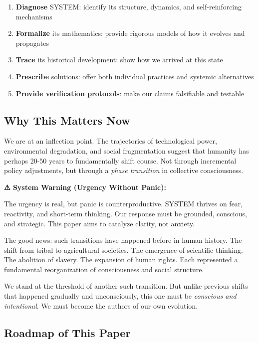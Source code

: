 \documentclass[11pt,a4paper]{article}
\theoremstyle{definition}
\theoremstyle{remark}
\newenvironment{systemwarning}[1]
{
    \begin{mdframed}[backgroundcolor=warningred!10,linecolor=warningred,linewidth=2pt]
    \textbf{⚠ System Warning (#1):}
}
{
    \end{mdframed}
}
\begin{document}
\begin{enumerate}
    \item \textbf{Diagnose} SYSTEM: identify its structure, dynamics, and self-reinforcing mechanisms
    \item \textbf{Formalize} its mathematics: provide rigorous models of how it evolves and propagates
    \item \textbf{Trace} its historical development: show how we arrived at this state
    \item \textbf{Prescribe} solutions: offer both individual practices and systemic alternatives
    \item \textbf{Provide verification protocols}: make our claims falsifiable and testable
\end{enumerate}

\subsection{Why This Matters Now}

We are at an inflection point. The trajectories of technological power, environmental degradation, and social fragmentation suggest that humanity has perhaps 20-50 years to fundamentally shift course. Not through incremental policy adjustments, but through a \textit{phase transition} in collective consciousness.

\begin{systemwarning}{Urgency Without Panic}
The urgency is real, but panic is counterproductive. SYSTEM thrives on fear, reactivity, and short-term thinking. Our response must be grounded, conscious, and strategic. This paper aims to catalyze clarity, not anxiety.
\end{systemwarning}

The good news: such transitions have happened before in human history. The shift from tribal to agricultural societies. The emergence of scientific thinking. The abolition of slavery. The expansion of human rights. Each represented a fundamental reorganization of consciousness and social structure.

We stand at the threshold of another such transition. But unlike previous shifts that happened gradually and unconsciously, this one must be \textit{conscious and intentional}. We must become the authors of our own evolution.

\subsection{Roadmap of This Paper}
\end{document}
